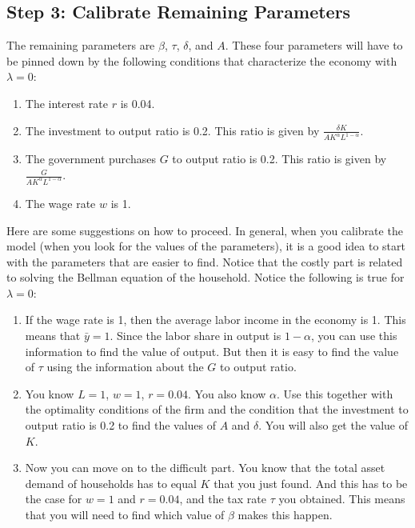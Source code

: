 \documentclass{article}
\begin{document}
\subsection*{Step 3: Calibrate Remaining Parameters}
The remaining parameters are \(\beta\), \(\tau\), \(\delta\), and \(A\). These four parameters will have to be pinned down by the following conditions that characterize the economy with \(\lambda = 0\):

\begin{enumerate}
    \item The interest rate \(r\) is 0.04.
    \item The investment to output ratio is 0.2. This ratio is given by \(\frac{\delta K}{A K^{\alpha} L^{1 - \alpha}}\).
    \item The government purchases \(G\) to output ratio is 0.2. This ratio is given by \(\frac{G}{A K^{\alpha} L^{1 - \alpha}}\).
    \item The wage rate \(w\) is 1.
\end{enumerate}

Here are some suggestions on how to proceed. In general, when you calibrate the model (when you look for the values of the parameters), it is a good idea to start with the parameters that are easier to find. Notice that the costly part is related to solving the Bellman equation of the household. Notice the following is true for \(\lambda = 0\):

\begin{enumerate}
    \item If the wage rate is 1, then the average labor income in the economy is 1. This means that \(\bar{y} = 1\). Since the labor share in output is \(1 - \alpha\), you can use this information to find the value of output. But then it is easy to find the value of \(\tau\) using the information about the \(G\) to output ratio.
    \item You know \(L = 1\), \(w = 1\), \(r = 0.04\). You also know \(\alpha\). Use this together with the optimality conditions of the firm and the condition that the investment to output ratio is 0.2 to find the values of \(A\) and \(\delta\). You will also get the value of \(K\).
    \item Now you can move on to the difficult part. You know that the total asset demand of households has to equal \(K\) that you just found. And this has to be the case for \(w = 1\) and \(r = 0.04\), and the tax rate \(\tau\) you obtained. This means that you will need to find which value of \(\beta\) makes this happen.
\end{enumerate}
\end{document}
